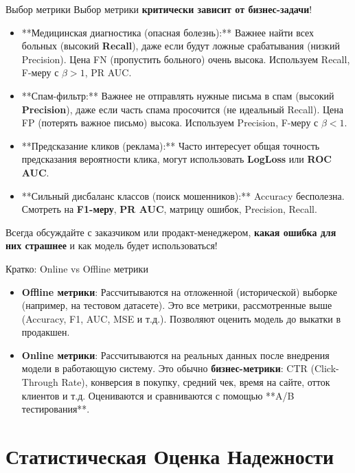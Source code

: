\begin{alerttextbox}{Выбор метрики}
    Выбор метрики \textbf{критически зависит от бизнес-задачи}!
    \begin{itemize}
        \item **Медицинская диагностика (опасная болезнь):** Важнее найти всех больных (высокий \textbf{Recall}), даже если будут ложные срабатывания (низкий Precision). Цена FN (пропустить больного) очень высока. Используем Recall, F-меру с $\beta > 1$, PR AUC.
        \item **Спам-фильтр:** Важнее не отправлять нужные письма в спам (высокий \textbf{Precision}), даже если часть спама просочится (не идеальный Recall). Цена FP (потерять важное письмо) высока. Используем Precision, F-меру с $\beta < 1$.
        \item **Предсказание кликов (реклама):** Часто интересует общая точность предсказания вероятности клика, могут использовать \textbf{LogLoss} или \textbf{ROC AUC}.
        \item **Сильный дисбаланс классов (поиск мошенников):** Accuracy бесполезна. Смотреть на \textbf{F1-меру}, \textbf{PR AUC}, матрицу ошибок, Precision, Recall.
    \end{itemize}
    Всегда обсуждайте с заказчиком или продакт-менеджером, \textbf{какая ошибка для них страшнее} и как модель будет использоваться!
\end{alerttextbox}

\begin{myblock}{Кратко: Online vs Offline метрики}
    \begin{itemize}
        \item \textbf{Offline метрики}: Рассчитываются на отложенной (исторической) выборке (например, на тестовом датасете). Это все метрики, рассмотренные выше (Accuracy, F1, AUC, MSE и т.д.). Позволяют оценить модель до выкатки в продакшен.
        \item \textbf{Online метрики}: Рассчитываются на реальных данных после внедрения модели в работающую систему. Это обычно \textbf{бизнес-метрики}: CTR (Click-Through Rate), конверсия в покупку, средний чек, время на сайте, отток клиентов и т.д. Оцениваются и сравниваются с помощью **A/B тестирования**.
    \end{itemize}
\end{myblock}

\section{Статистическая Оценка Надежности}

